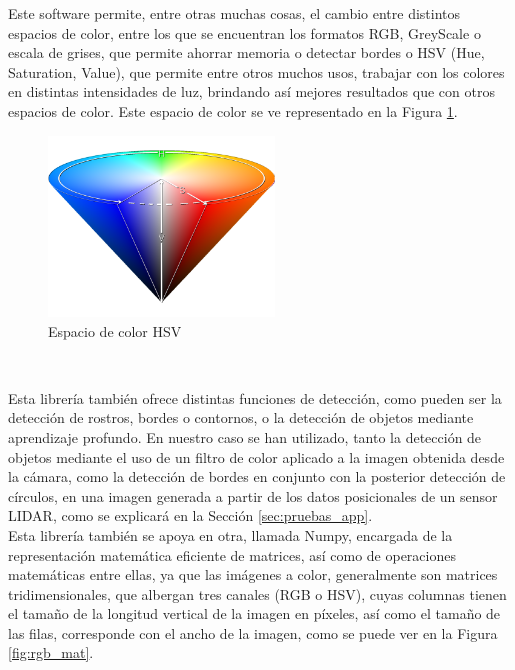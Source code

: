 Este software permite, entre otras muchas cosas, el cambio entre distintos
espacios de color, entre los que se encuentran los formatos RGB, GreyScale o
escala de grises, que permite ahorrar memoria o detectar bordes o HSV (Hue,
Saturation, Value), que permite entre otros muchos usos, trabajar con los
colores en distintas intensidades de luz, brindando así mejores resultados que
con otros espacios de color.
Este espacio de color se ve representado en la Figura \ref{fig:hsv}.
\\

\begin{figure} [h!]
  \begin{center}
    \includegraphics[width=6cm]{figs/hsv_cone}
  \end{center}
  \caption{Espacio de color HSV \cite{hsv_cone}}
  \label{fig:hsv}
\end{figure}\

Esta librería también ofrece distintas funciones de detección, como pueden ser
la detección de rostros, bordes o contornos, o la detección de objetos mediante
aprendizaje profundo.
En nuestro caso se han utilizado, tanto la detección de objetos mediante el uso
de un filtro de color aplicado a la imagen obtenida desde la cámara, como la
detección de bordes en conjunto con la posterior detección de círculos, en una
imagen generada a partir de los datos posicionales de un sensor LIDAR, como se
explicará en la Sección \ref{sec:pruebas_app}.
\\

Esta librería también se apoya en otra, llamada Numpy, encargada de la
representación matemática eficiente de matrices, así como de operaciones
matemáticas entre ellas, ya que las imágenes a color, generalmente son matrices
tridimensionales, que albergan tres canales (RGB o HSV), cuyas columnas tienen
el tamaño de la longitud vertical de la imagen en píxeles, así como el tamaño de
las filas, corresponde con el ancho de la imagen, como se puede ver en la Figura
\ref{fig:rgb_mat}.
\\

